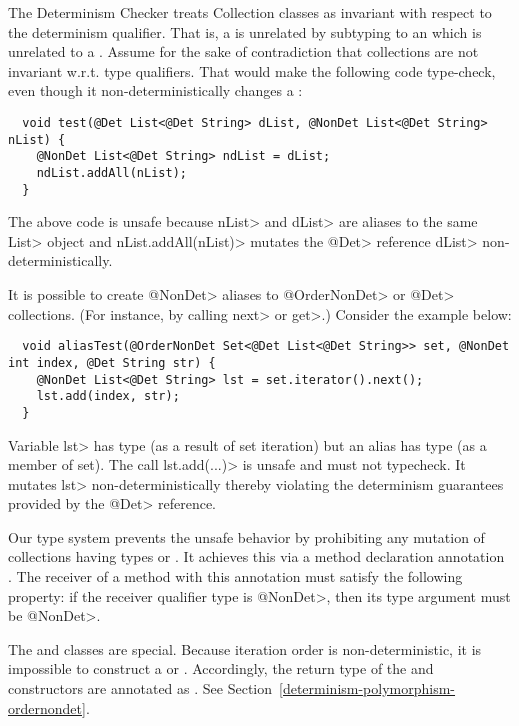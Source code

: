 The Determinism Checker treats Collection classes as
invariant with respect to the determinism qualifier. That is, a
 is unrelated by subtyping to an 
which is unrelated to a .
Assume for the sake of contradiction that collections are not invariant w.r.t. type qualifiers.
That would make the following code type-check, even though it
non-deterministically changes a :
\begin{Verbatim}
  void test(@Det List<@Det String> dList, @NonDet List<@Det String> nList) {
    @NonDet List<@Det String> ndList = dList;
    ndList.addAll(nList);
  }
\end{Verbatim}

The above code is unsafe because \<nList> and \<dList> are aliases to
the same \<List> object and \<nList.addAll(nList)> mutates the \<@Det>
reference \<dList> non-deterministically.

It is possible to create \<@NonDet> aliases to \<@OrderNonDet> or \<@Det> collections.
(For instance, by calling \<next> or \<get>.) Consider the example below:
\begin{Verbatim}
  void aliasTest(@OrderNonDet Set<@Det List<@Det String>> set, @NonDet int index, @Det String str) {
    @NonDet List<@Det String> lst = set.iterator().next();
    lst.add(index, str);
  }
\end{Verbatim}

Variable \<lst> has type  (as a result of set iteration)
but an alias has type  (as a member of set).
The call \<lst.add(...)> is unsafe and must not typecheck. It
mutates \<lst> non-deterministically thereby violating the determinism
guarantees provided by the \<@Det> reference.

Our type system prevents the unsafe behavior by prohibiting
any mutation of collections having types  or
. It achieves
this via a method declaration annotation .
The receiver of a method with this annotation must satisfy the following property: if the
receiver qualifier type is \<@NonDet>, then its type argument must be \<@NonDet>.

The  and  classes are special. Because iteration order is
non-deterministic, it is impossible to construct a 
or .
Accordingly, the return type of the  and 
constructors are annotated as . See
Section~\ref{determinism-polymorphism-ordernondet}.

